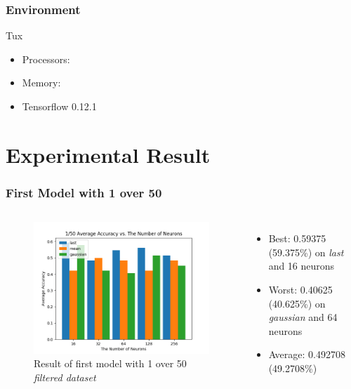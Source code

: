 \documentclass{beamer}
\begin{document}
\begin{frame}
\frametitle{Environment}
Tux
\begin{itemize}
\item Processors:
\item Memory:
\item Tensorflow 0.12.1
\end{itemize}
\end{frame}

\section{Experimental Result}

\begin{frame}
\frametitle{First Model with 1 over 50}
\begin{columns}
\begin{figure}[tb]
    \centering
    \includegraphics[width=\textwidth]{../paper/pictures/result_pictures/filtered_1_50_result.png}
    \caption{Result of first model with 1 over 50 {\em filtered dataset}}
    \label{fig:filter_1_50}
\end{figure}

\begin{itemize}
\item Best: 0.59375 (59.375\%) on {\em last} and 16 neurons
\item Worst: 0.40625 (40.625\%) on {\em gaussian} and 64 neurons
\item Average: 0.492708 (49.2708\%)
\end{itemize}
\end{columns}
\end{frame}
\end{document}
